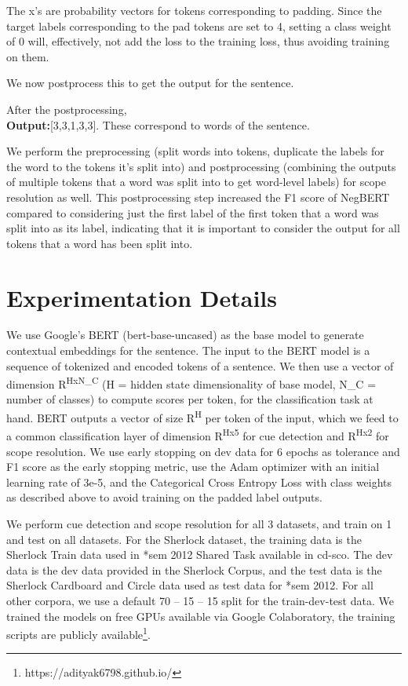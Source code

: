 \documentclass[10pt, a4paper]{article}
\begin{document}
\par The x’s are probability vectors for tokens corresponding to padding. Since the target labels corresponding to the pad tokens are set to 4, setting a class weight of 0 will, effectively, not add the loss to the training loss, thus avoiding training on them.
\par We now postprocess this to get the output for the sentence.
\par After the postprocessing,\\
    \textbf{Output:}[3,3,1,3,3]. These correspond to words of the sentence.
\par We perform the preprocessing (split words into tokens, duplicate the labels for the word to the tokens it’s split into) and postprocessing (combining the outputs of multiple tokens that a word was split into to get word-level labels) for scope resolution as well. This postprocessing step increased the F1 score of NegBERT compared to considering just the first label of the first token that a word was split into as its label, indicating that it is important to consider the output for all tokens that a word has been split into.

\section{Experimentation Details}
We use Google’s BERT \cite{bert} (bert-base-uncased) as the base model to generate contextual embeddings for the sentence. The input to the BERT model is a sequence of tokenized and encoded tokens of a sentence. We then use a vector of dimension R\textsuperscript{HxN\_C} (H = hidden state dimensionality of base model, N\_C = number of classes) to compute scores per token, for the classification task at hand. BERT outputs a vector of size R\textsuperscript{H} per token of the input, which we feed to a common classification layer of dimension R\textsuperscript{Hx5} for cue detection and R\textsuperscript{Hx2} for scope resolution. We use early stopping on dev data for 6 epochs as tolerance and F1 score as the early stopping metric, use the Adam optimizer with an initial learning rate of 3e-5, and the Categorical Cross Entropy Loss with class weights as described above to avoid training on the padded label outputs.
\par We perform cue detection and scope resolution for all 3 datasets, and train on 1 and test on all datasets. For the Sherlock dataset, the training data is the Sherlock Train data used in *sem 2012 Shared Task available in cd-sco. The dev data is the dev data provided in the Sherlock Corpus, and the test data is the Sherlock Cardboard and Circle data used as test data for *sem 2012. For all other corpora, we use a default 70 – 15 – 15 split for the train-dev-test data. We trained the models on free GPUs available via Google Colaboratory, the training scripts are publicly available\footnote{https://adityak6798.github.io/}.
\end{document}
